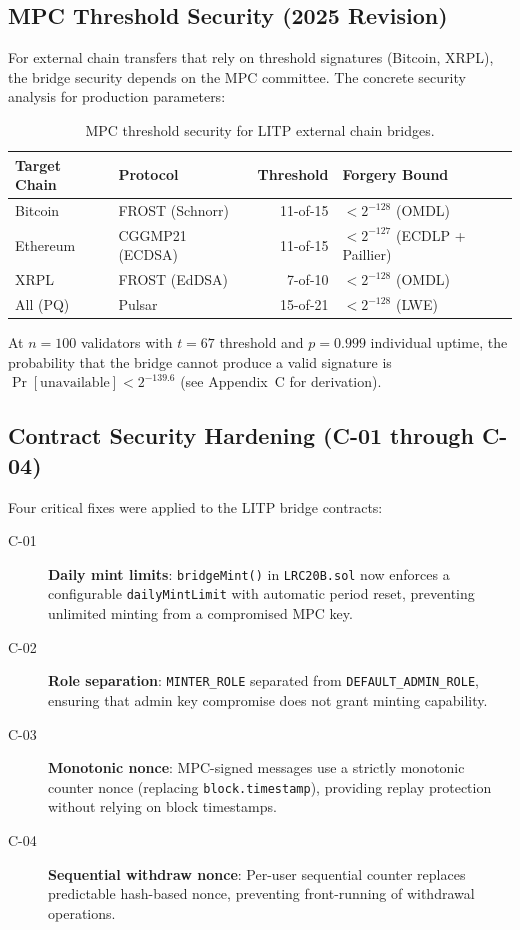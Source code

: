\subsection{MPC Threshold Security (2025 Revision)}

For external chain transfers that rely on threshold signatures (Bitcoin, XRPL), the bridge security depends on the MPC committee. The concrete security analysis for production parameters:

\begin{table}[H]
\centering
\caption{MPC threshold security for LITP external chain bridges.}
\label{tab:mpc_security}
\begin{tabular}{llrl}
\toprule
\textbf{Target Chain} & \textbf{Protocol} & \textbf{Threshold} & \textbf{Forgery Bound} \\
\midrule
Bitcoin & FROST (Schnorr) & 11-of-15 & $< 2^{-128}$ (OMDL) \\
Ethereum & CGGMP21 (ECDSA) & 11-of-15 & $< 2^{-127}$ (ECDLP + Paillier) \\
XRPL & FROST (EdDSA) & 7-of-10 & $< 2^{-128}$ (OMDL) \\
All (PQ) & Pulsar & 15-of-21 & $< 2^{-128}$ (LWE) \\
\bottomrule
\end{tabular}
\end{table}

At $n = 100$ validators with $t = 67$ threshold and $p = 0.999$ individual uptime, the probability that the bridge cannot produce a valid signature is $\Pr[\text{unavailable}] < 2^{-139.6}$ (see \cite{lux-bridge-2025} Appendix~C for derivation).

\subsection{Contract Security Hardening (C-01 through C-04)}

Four critical fixes were applied to the LITP bridge contracts:

\begin{description}
    \item[C-01] \textbf{Daily mint limits}: \texttt{bridgeMint()} in \texttt{LRC20B.sol} now enforces a configurable \texttt{dailyMintLimit} with automatic period reset, preventing unlimited minting from a compromised MPC key.
    \item[C-02] \textbf{Role separation}: \texttt{MINTER\_ROLE} separated from \texttt{DEFAULT\_ADMIN\_ROLE}, ensuring that admin key compromise does not grant minting capability.
    \item[C-03] \textbf{Monotonic nonce}: MPC-signed messages use a strictly monotonic counter nonce (replacing \texttt{block.timestamp}), providing replay protection without relying on block timestamps.
    \item[C-04] \textbf{Sequential withdraw nonce}: Per-user sequential counter replaces predictable hash-based nonce, preventing front-running of withdrawal operations.
\end{description}

